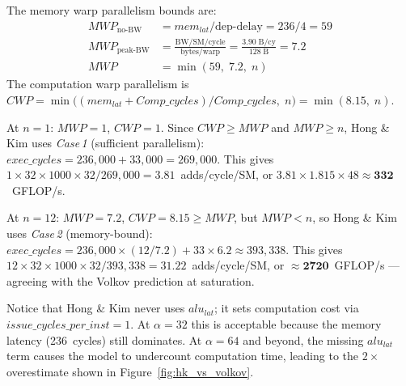 The memory warp parallelism bounds are:
%
\begin{align*}
  \mathit{MWP}_{\text{no-BW}} &= mem_{lat} / \text{dep-delay}
                                = 236 / 4 = 59 \\
  \mathit{MWP}_{\text{peak-BW}} &= \frac{\text{BW/SM/cycle}}{\text{bytes/warp}}
                                = \frac{3.90\;\text{B/cy}}{128\;\text{B}} = 7.2 \\
  \mathit{MWP} &= \min(59,\; 7.2,\; n)
\end{align*}
%
The computation warp parallelism is
$\mathit{CWP} = \min\!\bigl((mem_{lat} + \mathit{Comp\_cycles})/\mathit{Comp\_cycles},\; n\bigr)
              = \min(8.15,\; n)$.

At $n = 1$: $\mathit{MWP} = 1$, $\mathit{CWP} = 1$.
Since $\mathit{CWP} \geq \mathit{MWP}$ and $\mathit{MWP} \geq n$, Hong \& Kim
uses \emph{Case\,1} (sufficient parallelism):
$\mathit{exec\_cycles} = 236{,}000 + 33{,}000 = 269{,}000$.
This gives $1 \times 32 \times 1000 \times 32 / 269{,}000 = 3.81$~adds/cycle/SM,
or $3.81 \times 1.815 \times 48 \approx \mathbf{332}$~GFLOP/s.

At $n = 12$: $\mathit{MWP} = 7.2$, $\mathit{CWP} = 8.15 \geq \mathit{MWP}$, but
$\mathit{MWP} < n$, so Hong \& Kim uses \emph{Case\,2} (memory-bound):
$\mathit{exec\_cycles} = 236{,}000 \times (12/7.2) + 33 \times 6.2 \approx 393{,}338$.
This gives $12 \times 32 \times 1000 \times 32 / 393{,}338 = 31.22$~adds/cycle/SM,
or $\approx \mathbf{2720}$~GFLOP/s --- agreeing with the Volkov prediction at saturation.

Notice that Hong \& Kim never uses $alu_{lat}$; it sets computation cost via
$\mathit{issue\_cycles\_per\_inst} = 1$.
At $\alpha = 32$ this is acceptable because the memory latency (236~cycles)
still dominates.
At $\alpha = 64$ and beyond, the missing $alu_{lat}$ term causes the model to
undercount computation time, leading to the $2\times$ overestimate shown in
Figure~\ref{fig:hk_vs_volkov}.

